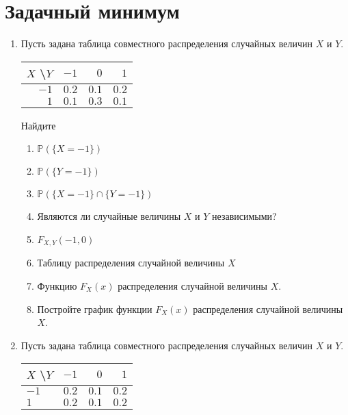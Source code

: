 \documentclass[12pt]{article}
\def \P{\mathbb{P}}
\begin{document}
\section{Задачный минимум}

\begin{enumerate}

\item Пусть задана таблица совместного распределения случайных величин $X$ и $Y$.

\begin{center}\begin{tabular}{r|rrr}
\toprule
 $X$ \textbackslash $Y$    & $-1$  & $0$   & $1$   \\ \midrule
$-1$                 & $0.2$ & $0.1$ & $0.2$ \\
 $1$                 & $0.1$ & $0.3$ & $0.1$ \\ \bottomrule
\end{tabular}\end{center}


Найдите
\begin{enumerate}
\item $\P(\{X = -1\})$
\item $\P(\{Y = -1\})$
\item $\P(\{X = -1\}\cap\{Y = -1\})$
\item Являются ли случайные величины $X$ и $Y$ независимыми?
\item $F_{X,Y}(-1,0)$
\item Таблицу распределения случайной величины $X$
\item Функцию $F_{X}(x)$ распределения случайной величины $X$.
\item Постройте график функции $F_{X}(x)$ распределения случайной величины $X$.
\end{enumerate}

\item Пусть задана таблица совместного распределения случайных величин $X$ и $Y$.


\begin{center}\begin{tabular}{l|rrr}
\toprule
 $X$ \textbackslash $Y$    & $-1$  & $0$  & $1$   \\ \midrule
$-1$                 & $0.2$ & $0.1$ & $0.2$ \\
 $1$                 & $0.2$ & $0.1$ & $0.2$ \\ \bottomrule
\end{tabular}\end{center}


\end{enumerate}
\end{document}
